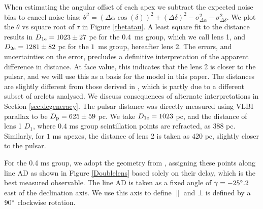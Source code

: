 \documentclass[useAMS,usenatbib]{mn2e}
\begin{document}
When estimating the
angular offset of each apex
we subtract the expected noise bias to cancel noise bias:
${\theta}^2=({\Delta\alpha}\cos(\delta))^2+({\Delta\delta})^2-\sigma^2_{\Delta\alpha}-\sigma^2_{\Delta\delta}$. 
We plot the $\theta$ vs square root of $\tau$ in Figure
\ref{thetatau}. A least square fit to the distance results in
$D_{1{\rm e}}=1023\pm 27$ pc for the  $0.4$\ ms group, which we call lens 1, and
$D_{2{\rm e}} = 1281 \pm 82$ pc for the $1$\ ms group, hereafter lens 2.
The errors, and uncertainties on the error, precludes a definitive
interpretation of the apparent difference in distance.  At face value, 
this indicates that the lens 2 is closer to the pulsar, and we will
use this as a basis for the model in this paper.  
The distances are slightly different from those derived in
\citep{2010ApJ...708..232B}, which is partly due to a different subset
of arclets analysed. We discuss
consequences of alternate interpretations in Section \ref{sec:degeneracy}.
The pulsar distance was directly measured using VLBI parallax to be
$D_{\rm p} = 625 \pm 59$ pc.  
We take $D_{1{\rm e}}=1023$ pc,  and the distance of lens 1 $D_{1}$,
where $0.4$ ms group scintillation points are refracted, as $388$
pc. Similarly, for $1$ ms apexes, the distance of lens 2 is taken as $420$ pc,
slightly closer to the pulsar.


For the 0.4 ms group, we adopt the geometry from
\citep{2010ApJ...708..232B}, assigning these points along line AD as
shown in Figure \ref{Doublelens} based solely on their delay, which is
the best measured observable. The line AD is taken as a
fixed angle of $\gamma=-25\degree.2$ east of the
declination axis. We use this axis
to define ${\parallel}$ and ${\bot}$ is defined by a $90\degree$ clockwise
rotation.  
\end{document}
